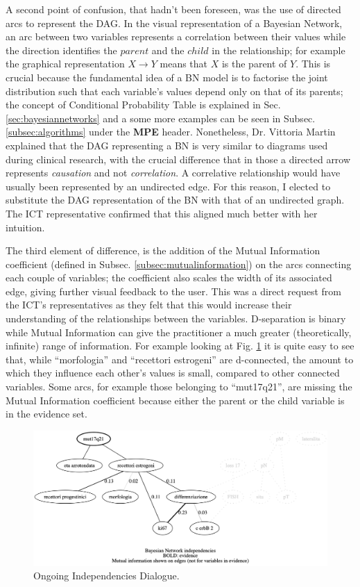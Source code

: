 A second point of confusion, that hadn't been foreseen, was the use of directed arcs to represent the DAG.
In the visual representation of a Bayesian Network, an arc between two variables represents a correlation between their values while the direction identifies the $parent$ and the $child$ in the relationship; for example the graphical representation $X \rightarrow Y$ means that $X$ is the parent of $Y$.
This is crucial because the fundamental idea of a BN model is to factorise the joint distribution such that each variable's values depend only on that of its parents; the concept of Conditional Probability Table is explained in Sec. \ref{sec:bayesiannetworks} and a some more examples can be seen in Subsec. \ref{subsec:algorithms} under the \textbf{MPE} header.
Nonetheless, Dr. Vittoria Martin explained that the DAG representing a BN is very similar to diagrams used during clinical research, with the crucial difference that in those a directed arrow represents \textit{causation} and not \textit{correlation}.
A correlative relationship would have usually been represented by an undirected edge.
For this reason, I elected to substitute the DAG representation of the BN with that of an undirected graph.
The ICT representative confirmed that this aligned much better with her intuition.

The third element of difference, is the addition of the Mutual Information coefficient (defined in Subsec. \ref{subsec:mutualinformation}) on the arcs connecting each couple of variables; the coefficient also scales the width of its associated edge, giving further visual feedback to the user.
This was a direct request from the ICT's representatives as they felt that this would increase their understanding of the relationships between the variables.
D-separation is binary while Mutual Information can give the practitioner a much greater (theoretically, infinite) range of information.
For example looking at Fig. \ref{fig:independencies_dialogue_output} it is quite easy to see that, while \enquote{morfologia} and \enquote{recettori estrogeni} are d-connected, the amount to which they influence each other's values is small, compared to other connected variables.
Some arcs, for example those belonging to \enquote{mut17q21}, are missing the Mutual Information coefficient because either the parent or the child variable is in the evidence set.

\begin{figure}[htbp]
\centerline{\includegraphics[width=\columnwidth]{results/images/independencies_dialogue_output}}
\caption{Ongoing Independencies Dialogue.}
\label{fig:independencies_dialogue_output}
\end{figure}

